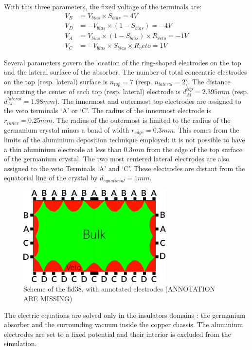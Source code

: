 With this three parameters, the fixed voltage of the terminals are:
\begin{align}
V_B &= V_{bias} \times S_{bias} = 4V \\
V_D &= - V_{bias} \times (1 - S_{bias}) = -4V \\
V_A &= V_{bias} \times (1 - S_{bias}) \times R_{veto} = -1V \\
V_C &= - V_{bias} \times S_{bias} \times R_veto = 1V
\end{align}

Several parameters govern the location of the ring-shaped electrodes on the top and the lateral surface of the absorber. The number of total concentric electrodes on the top (resp. lateral) surface is $n_{top}=7$ (resp. $n_{lateral}=2$). The distance separating the center of each top (resp. lateral) electrode is $d_{Al}^{top}=2.395mm$ (resp. $d_{Al}^{lateral}=1.98mm$). The innermost and outermost top electrodes are assigned to the veto terminals ‘A’ or ‘C’. The radius of the innermost electrode is $r_{inner}=0.25mm$. The radius of the outermost is limited to the radius of the germanium crystal minus a band of width $r_{edge}=0.3mm$. This comes from the limits of the aluminium deposition technique employed: it is not possible to have a thin aluminium electrode at less than $0.3mm$ from the edge of the top surface of the germanium crystal. The two most centered lateral electrodes are also assigned to the veto Terminals ‘A’ and ‘C’. These electrodes are distant from the equatorial line of the crystal by $d_{equatorial}=1mm$.

\begin{figure}
\centering
\includegraphics[height=5cm]{Figures/Electrodes/scheme_fid38.pdf}
\caption{
Scheme of the fid38, with annotated electrodes (ANNOTATION ARE MISSING)
}
\label{fig:fid38-scheme}
\end{figure}

The electric equations are solved only in the insulators domains : the germanium absorber and the surrounding vacuum inside the copper chassis. The aluminium electrodes are set to a fixed potential and their interior is excluded from the simulation. 

